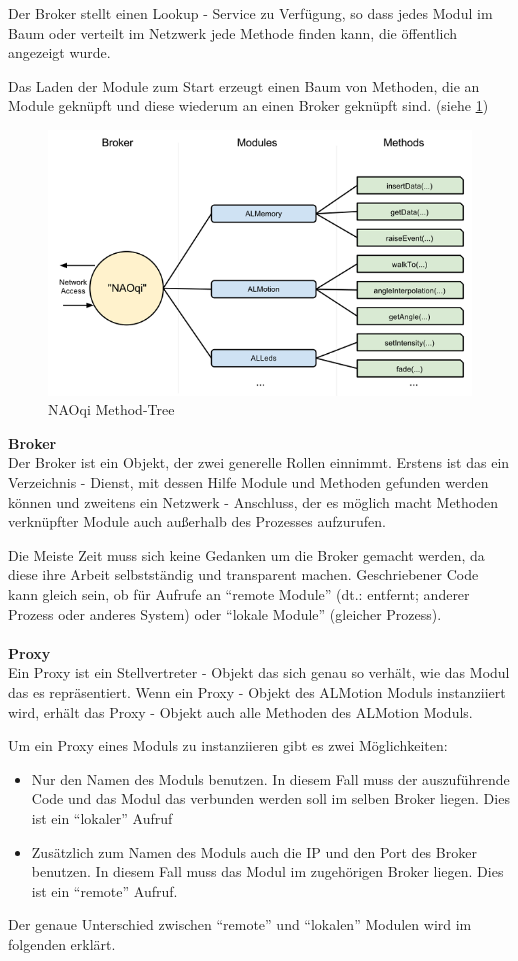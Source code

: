 Der Broker 	stellt einen Lookup - Service zu Verfügung, so dass jedes Modul im Baum oder verteilt im Netzwerk jede Methode finden kann, die öffentlich angezeigt wurde.

Das Laden der Module zum Start erzeugt einen Baum von Methoden, die an Module geknüpft und diese wiederum an einen Broker geknüpft sind. (siehe \ref{f:naoqi_broker2})

\begin{figure}[H]						
	\centering							
	\includegraphics[scale=0.8]{Bilder/naoqi_process2.PNG}
	\caption{NAOqi Method-Tree}						
	\label{f:naoqi_broker2}						
\end{figure}
\noindent
\textbf{Broker}
\\
Der Broker ist ein Objekt, der zwei generelle Rollen einnimmt. Erstens ist das ein Verzeichnis - Dienst, mit dessen Hilfe Module und Methoden gefunden werden können und zweitens ein Netzwerk - Anschluss, der es möglich macht Methoden verknüpfter Module auch außerhalb des Prozesses aufzurufen.

Die Meiste Zeit muss sich keine Gedanken um die Broker gemacht werden, da diese ihre Arbeit selbstständig und transparent machen. Geschriebener Code kann gleich sein, ob für Aufrufe an "`remote Module"' (dt.: entfernt; anderer Prozess oder anderes System) oder "`lokale Module"' (gleicher Prozess).
\\
\\
\textbf{Proxy}
\\
Ein Proxy ist ein Stellvertreter - Objekt das sich genau so verhält, wie das Modul das es repräsentiert. Wenn ein Proxy - Objekt des ALMotion Moduls instanziiert wird, erhält das Proxy - Objekt auch alle Methoden des ALMotion Moduls.

Um ein Proxy eines Moduls zu instanziieren gibt es zwei Möglichkeiten: 
\begin{itemize}
\item Nur den Namen des Moduls benutzen. In diesem Fall muss der auszuführende Code und das Modul das verbunden werden soll im selben Broker liegen. Dies ist ein "`lokaler"' Aufruf
\item Zusätzlich zum Namen des Moduls auch die IP und den Port des Broker benutzen. In diesem Fall muss das Modul im zugehörigen Broker liegen. Dies ist ein "`remote"' Aufruf.
\end{itemize}
Der genaue Unterschied zwischen "`remote"' und "`lokalen"' Modulen wird im folgenden erklärt.
\\
